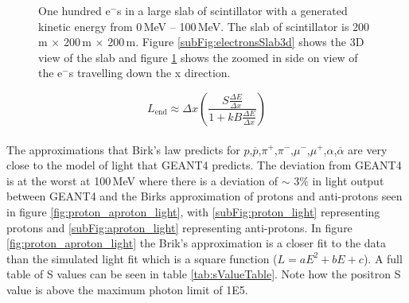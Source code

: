 \begin{figure}[!h]
\begin{subfigure}{.5\textwidth}
  \captionsetup{width=.9\linewidth}
  \caption{}
  \label{subFig:electronsSlabSideOn}
\end{subfigure}
\caption{One hundred e$^-$s in a large slab of scintillator with a generated kinetic energy from 0\,MeV -- 100\,MeV. The slab of scintillator is 200\,m $\times$ 200\,m $\times$ 200\,m. Figure \ref{subFig:electronsSlab3d} shows the 3D view of the slab and figure \ref{subFig:electronsSlabSideOn} shows the zoomed in side on view of the e$^-$s travelling down the x direction.}
\label{fig:electrons_viewed_in_slab}
\end{figure}

\begin{equation}
L_{\textrm{end}}\approx \Delta x \left(\frac{S\frac{\Delta E}{\Delta x}}{1 + kB \frac{\Delta E}{\Delta x}}\right) 
\label{equ:light_produced}
\end{equation}
\\The approximations that Birk's law predicts for $p$,$\overline{p}$,$\pi^+$,$\pi^-$,$\mu^-$,$\mu^+$,$\alpha$,$\overline{\alpha}$ are very close to the model of light that GEANT4 predicts. The deviation from GEANT4 is at the worst at 100\,MeV where there is a deviation of $\sim$ $3\%$ in light output between GEANT4 and the Birks approximation of protons and anti-protons seen in figure \ref{fig:proton_aproton_light}, with \ref{subFig:proton_light} representing protons and \ref{subFig:aproton_light} representing anti-protons. In figure \ref{fig:proton_aproton_light} the Brik's approximation is a closer fit to the data than the simulated light fit which is a square function ($L = aE^2 + bE+ c$). A full table of S values can be seen in table \ref{tab:sValueTable}. Note how the positron S value is above the maximum photon limit of 1E5. 

